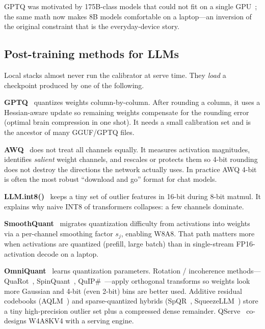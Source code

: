 GPTQ was motivated by 175B-class models that could not fit on a single GPU~\citep{frantar2022gptq}; the same math now makes 8B models comfortable on a laptop---an inversion of the original constraint that is the everyday-device story.

\subsection{Post-training methods for LLMs}

Local stacks almost never run the calibrator at serve time. They \emph{load} a checkpoint produced by one of the following.

\textbf{GPTQ}~\citep{frantar2022gptq} quantizes weights column-by-column. After rounding a column, it uses a Hessian-aware update so remaining weights compensate for the rounding error (optimal brain compression in one shot). It needs a small calibration set and is the ancestor of many GGUF/GPTQ files.

\textbf{AWQ}~\citep{lin2023awq} does not treat all channels equally. It measures activation magnitudes, identifies \emph{salient} weight channels, and rescales or protects them so 4-bit rounding does not destroy the directions the network actually uses. In practice AWQ 4-bit is often the most robust ``download and go'' format for chat models.

\textbf{LLM.int8()}~\citep{dettmers2022llmint8} keeps a tiny set of outlier features in 16-bit during 8-bit matmul. It explains why naive INT8 of transformers collapses: a few channels dominate.

\textbf{SmoothQuant}~\citep{xiao2023smoothquant} migrates quantization difficulty from activations into weights via a per-channel smoothing factor \(s_j\), enabling W8A8. That path matters more when activations are quantized (prefill, large batch) than in single-stream FP16-activation decode on a laptop.

\textbf{OmniQuant}~\citep{shao2024omniquant} learns quantization parameters. Rotation / incoherence methods---QuaRot~\citep{ashkboos2024quarot}, SpinQuant~\citep{che2024spinquant}, QuIP\#~\citep{tseng2024quip}---apply orthogonal transforms so weights look more Gaussian and 4-bit (even 2-bit) bins are better used. Additive residual codebooks (AQLM~\citep{egiazarian2024aqlm}) and sparse-quantized hybrids (SpQR~\citep{frantar2023spqr}, SqueezeLLM~\citep{kim2023squeezellm}) store a tiny high-precision outlier set plus a compressed dense remainder. QServe~\citep{lin2024qserve} co-designs W4A8KV4 with a serving engine.

